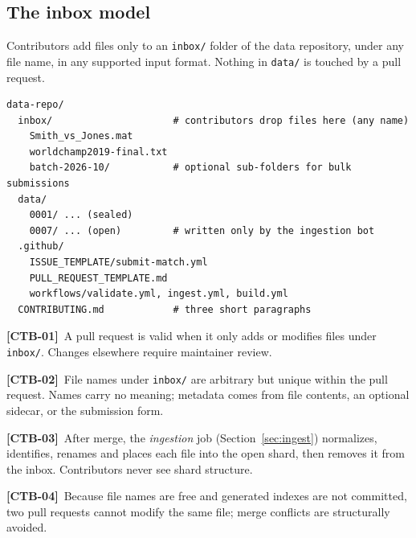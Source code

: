 \documentclass[11pt,a4paper]{article}
\newcommand{\kw}[1]{\textit{#1}\index{#1}}
\newcommand{\req}[2]{\par\smallskip\noindent\hypertarget{#1}{}\textbf{[#1]}\ #2\par}
\begin{document}
\subsection{The inbox model}\label{sec:inbox}
Contributors add files only to an \texttt{inbox/} folder of the data repository, under any file name, in any supported input format. Nothing in \texttt{data/} is touched by a pull request.
\begin{lstlisting}
data-repo/
  inbox/                     # contributors drop files here (any name)
    Smith_vs_Jones.mat
    worldchamp2019-final.txt
    batch-2026-10/           # optional sub-folders for bulk submissions
  data/
    0001/ ... (sealed)
    0007/ ... (open)         # written only by the ingestion bot
  .github/
    ISSUE_TEMPLATE/submit-match.yml
    PULL_REQUEST_TEMPLATE.md
    workflows/validate.yml, ingest.yml, build.yml
  CONTRIBUTING.md            # three short paragraphs
\end{lstlisting}
\req{CTB-01}{A pull request is valid when it only adds or modifies files under \texttt{inbox/}. Changes elsewhere require maintainer review.}
\req{CTB-02}{File names under \texttt{inbox/} are arbitrary but unique within the pull request. Names carry no meaning; metadata comes from file contents, an optional sidecar, or the submission form.}
\req{CTB-03}{After merge, the \kw{ingestion} job (Section~\ref{sec:ingest}) normalizes, identifies, renames and places each file into the open shard, then removes it from the inbox. Contributors never see shard structure.}
\req{CTB-04}{Because file names are free and generated indexes are not committed, two pull requests cannot modify the same file; merge conflicts are structurally avoided.}
\end{document}
